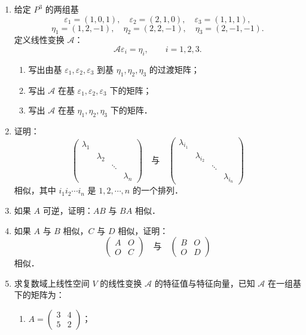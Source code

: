 \begin{enumerate}
\begin{enumerate}
  \anssub
  \end{enumerate}
  \item 给定 $P^3$ 的两组基
  \[
    \varepsilon_1=(1,0,1),\quad \varepsilon_2=(2,1,0),\quad \varepsilon_3=(1,1,1),
  \]
  \[
    \eta_1=(1,2,-1),\quad \eta_2=(2,2,-1),\quad \eta_3=(2,-1,-1).
  \]
  定义线性变换 $\mathcal{A}$：
  \[
    \mathcal{A}\varepsilon_i=\eta_i,\qquad i=1,2,3.
  \]
  \begin{enumerate}
    \item 写出由基 $\varepsilon_1,\varepsilon_2,\varepsilon_3$ 到基 $\eta_1,\eta_2,\eta_3$ 的过渡矩阵；
  \anssub
    \item 写出 $\mathcal{A}$ 在基 $\varepsilon_1,\varepsilon_2,\varepsilon_3$ 下的矩阵；
  \anssub
    \item 写出 $\mathcal{A}$ 在基 $\eta_1,\eta_2,\eta_3$ 下的矩阵．
  \anssub
  \end{enumerate}
  \item 证明：
  \[
    \begin{pmatrix}
      \lambda_1&&&\\
      &\lambda_2&&\\
      &&\ddots&\\
      &&&\lambda_n
    \end{pmatrix}
    \quad\text{与}\quad
    \begin{pmatrix}
      \lambda_{i_1}&&&\\
      &\lambda_{i_2}&&\\
      &&\ddots&\\
      &&&\lambda_{i_n}
    \end{pmatrix}
  \]
  相似，其中 $i_1i_2\cdots i_n$ 是 $1,2,\cdots,n$ 的一个排列．
  \ansproof
  \item 如果 $A$ 可逆，证明：$AB$ 与 $BA$ 相似．
  \ansproof
  \item 如果 $A$ 与 $B$ 相似，$C$ 与 $D$ 相似，证明：
  \[
    \begin{pmatrix}A&O\\O&C\end{pmatrix}
    \quad\text{与}\quad
    \begin{pmatrix}B&O\\O&D\end{pmatrix}
  \]
  相似．
  \ansproof
  \item 求复数域上线性空间 $V$ 的线性变换 $\mathcal{A}$ 的特征值与特征向量，已知 $\mathcal{A}$ 在一组基下的矩阵为：
  \begin{enumerate}
    \item $A=\begin{pmatrix}3&4\\5&2\end{pmatrix}$；

\end{enumerate}
\end{enumerate}
